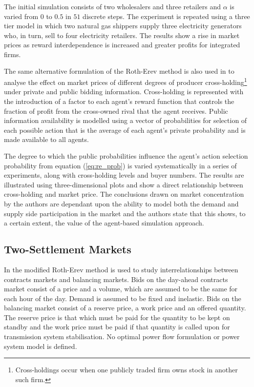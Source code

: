 The initial simulation consists of two wholesalers and three retailers and
$\alpha$ is varied from $0$ to $0.5$ in $51$ discrete steps.  The experiment is
repeated using a three tier model in which two natural gas shippers supply three
electricity generators who, in turn, sell to four electricity retailers. The
results show a rise in market prices as reward interdependence is increased and
greater profits for integrated firms.

The same alternative formulation of the Roth-Erev method is also used in
 to analyse the effect on market prices of different degrees
of producer cross-holding\footnote{Cross-holdings occur when one publicly traded
firm owns stock in another such firm.} under private and public bidding
information.  Cross-holding is represented with the introduction of a factor to
each agent's reward function that controls the fraction of profit from the
cross-owned rival that the agent receives.  Public information availability is
modelled using a vector of probabilities for selection of each possible action
that is the average of each agent's private probability and is made available to
all agents.

The degree to which the public probabilities influence the agent's action
selection probability from equation (\ref{eq:re_prob}) is varied systematically
in a series of experiments, along with cross-holding levels and buyer numbers.
The results are illustrated using three-dimensional plots and show a direct
relationship between cross-holding and market price. The conclusions drawn on
market concentration by the authors are dependant upon the ability to model both
the demand and supply side participation in the market and the authors state
that this shows, to a certain extent, the value of the agent-based simulation
approach.

\subsection{Two-Settlement Markets}
In  the modified Roth-Erev method is used to study
interrelationships between contracts markets and balancing markets.  Bids on the
day-ahead contracts market consist of a price and a volume, which are assumed to
be the same for each hour of the day.  Demand is assumed to be fixed and
inelastic.  Bids on the balancing market consist of a reserve price, a
work price and an offered quantity.  The reserve price is that which
must be paid for the quantity to be kept on standby and the work price must be
paid if that quantity is called upon for transmission system stabilisation. No
optimal power flow formulation or power system model is defined.

